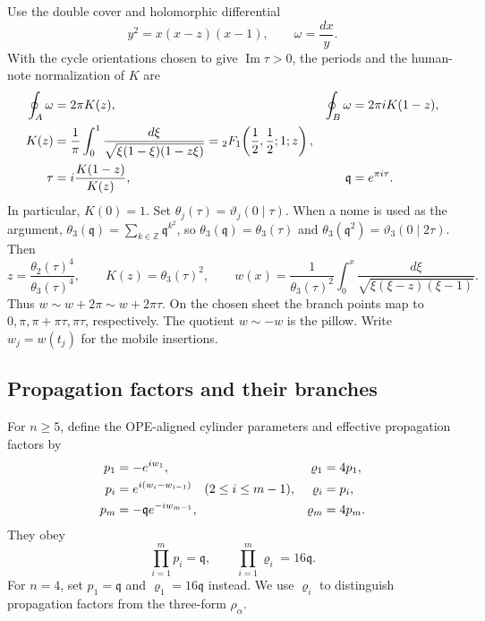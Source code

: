 \documentclass[11pt]{article}
\numberwithin{equation}{section}
\newcommand{\fq}{\mathfrak q}
\begin{document}
Use the double cover and holomorphic differential
\begin{equation}
 y^2=x(x-z)(x-1),\qquad \omega=\frac{dx}{y}.
\end{equation}
With the cycle orientations chosen to give $\operatorname{Im}\tau>0$,
the periods and the human-note normalization of $K$ are
\begin{align}
 \oint_A\omega&=2\pi K(z),&
 \oint_B\omega&=2\pi iK(1-z),\notag\\
 K(z)&=\frac1\pi\int_0^1
 \frac{d\xi}{\sqrt{\xi(1-\xi)(1-z\xi)}}
 ={}_2F_1\!\left(\frac12,\frac12;1;z\right),
 \label{eq:K}\\
 \tau&=i\frac{K(1-z)}{K(z)},&\fq&=e^{\pi i\tau}.
 \label{eq:nome}
\end{align}
In particular, $K(0)=1$. Set
$\theta_j(\tau)=\vartheta_j(0\mid\tau)$. When a nome is used as the
argument, $\theta_3(\fq)=\sum_{k\in\mathbb Z}\fq^{k^2}$, so
$\theta_3(\fq)=\theta_3(\tau)$ and
$\theta_3(\fq^2)=\vartheta_3(0\mid2\tau)$. Then
\begin{equation}
 z=\frac{\theta_2(\tau)^4}{\theta_3(\tau)^4},\qquad
 K(z)=\theta_3(\tau)^2,\qquad
 w(x)=\frac1{\theta_3(\tau)^2}
       \int_0^x\frac{d\xi}{\sqrt{\xi(\xi-z)(\xi-1)}}.
 \label{eq:AJ}
\end{equation}
Thus $w\sim w+2\pi\sim w+2\pi\tau$. On the chosen sheet the branch
points map to $0,\pi,\pi+\pi\tau,\pi\tau$, respectively. The quotient
$w\sim-w$ is the pillow. Write $w_j=w(t_j)$ for the mobile insertions.

\subsection{Propagation factors and their branches}

For $n\geq5$, define the OPE-aligned cylinder parameters and effective
propagation factors by
\begin{align}
 p_1&=-e^{iw_1},&\varrho_1&=4p_1,\notag\\
 p_i&=e^{i(w_i-w_{i-1})}\quad(2\leq i\leq m-1),
 &\varrho_i&=p_i,\notag\\
 p_m&=-\fq e^{-iw_{m-1}},&\varrho_m&=4p_m.
 \label{eq:propagation}
\end{align}
They obey
\begin{equation}
 \prod_{i=1}^m p_i=\fq,\qquad
 \prod_{i=1}^m\varrho_i=16\fq.
 \label{eq:propagation-product}
\end{equation}
For $n=4$, set $p_1=\fq$ and $\varrho_1=16\fq$ instead.
We use $\varrho_i$ to distinguish propagation factors from the three-form
$\rho_\alpha$.
\end{document}
